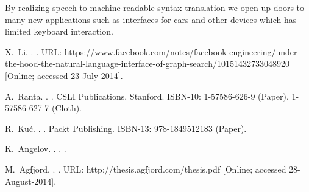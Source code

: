 \documentclass[10pt, a4paper]{article}
\begin{document}
By realizing speech to machine readable syntax translation we open up doors to many new applications such as interfaces for cars and other devices which has limited keyboard interaction.



\begin{thebibliography}{}

X.~Li.
.
.
\newblock URL: https://www.facebook.com/notes/facebook-engineering/under-the-hood-the-natural-language-interface-of-graph-search/10151432733048920 [Online; accessed 23-July-2014].

A.~Ranta.
.
.
\newblock CSLI Publications, Stanford.
\newblock ISBN-10: 1-57586-626-9 (Paper), 1-57586-627-7 (Cloth).

R.~Ku{\'{c}}.
.
.
\newblock Packt Publishing.
\newblock ISBN-13: 978-1849512183 (Paper).

K.~Angelov.
.
.
.

M.~Agfjord.
.
.
\newblock URL: http://thesis.agfjord.com/thesis.pdf [Online; accessed 28-August-2014].

\end{thebibliography}
\end{document}

